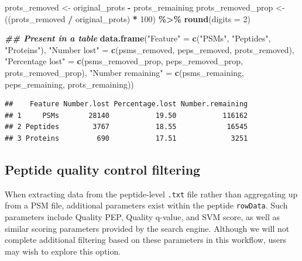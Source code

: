 \documentclass[9pt,a4paper,]{extarticle}
\newenvironment{Shaded}{\begin{snugshade}}{\end{snugshade}}
\newcommand{\AttributeTok}[1]{\textcolor[rgb]{0.13,0.29,0.53}{#1}}
\newcommand{\DecValTok}[1]{\textcolor[rgb]{0.00,0.00,0.81}{#1}}
\newcommand{\DocumentationTok}[1]{\textcolor[rgb]{0.56,0.35,0.01}{\textbf{\textit{#1}}}}
\newcommand{\FunctionTok}[1]{\textcolor[rgb]{0.13,0.29,0.53}{\textbf{#1}}}
\newcommand{\NormalTok}[1]{#1}
\newcommand{\OtherTok}[1]{\textcolor[rgb]{0.56,0.35,0.01}{#1}}
\newcommand{\SpecialCharTok}[1]{\textcolor[rgb]{0.81,0.36,0.00}{\textbf{#1}}}
\newcommand{\StringTok}[1]{\textcolor[rgb]{0.31,0.60,0.02}{#1}}
\begin{document}
\begin{Shaded}
\begin{Highlighting}[]
\NormalTok{prots\_removed }\OtherTok{\textless{}{-}}\NormalTok{ original\_prots }\SpecialCharTok{{-}}\NormalTok{ prots\_remaining}
\NormalTok{prots\_removed\_prop }\OtherTok{\textless{}{-}}\NormalTok{ ((prots\_removed }\SpecialCharTok{/}\NormalTok{ original\_prots) }\SpecialCharTok{*} \DecValTok{100}\NormalTok{) }\SpecialCharTok{\%\textgreater{}\%}
  \FunctionTok{round}\NormalTok{(}\AttributeTok{digits =} \DecValTok{2}\NormalTok{)}

\DocumentationTok{\#\# Present in a table}
\FunctionTok{data.frame}\NormalTok{(}\StringTok{"Feature"} \OtherTok{=} \FunctionTok{c}\NormalTok{(}\StringTok{"PSMs"}\NormalTok{,}
                         \StringTok{"Peptides"}\NormalTok{,}
                         \StringTok{"Proteins"}\NormalTok{),}
           \StringTok{"Number lost"} \OtherTok{=} \FunctionTok{c}\NormalTok{(psms\_removed,}
\NormalTok{                             peps\_removed,}
\NormalTok{                             prots\_removed),}
           \StringTok{"Percentage lost"} \OtherTok{=} \FunctionTok{c}\NormalTok{(psms\_removed\_prop,}
\NormalTok{                                 peps\_removed\_prop,}
\NormalTok{                                 prots\_removed\_prop),}
           \StringTok{"Number remaining"} \OtherTok{=} \FunctionTok{c}\NormalTok{(psms\_remaining,}
\NormalTok{                                  peps\_remaining,}
\NormalTok{                                  prots\_remaining))}
\end{Highlighting}
\end{Shaded}

\begin{verbatim}
##    Feature Number.lost Percentage.lost Number.remaining
## 1     PSMs       28140           19.50           116162
## 2 Peptides        3767           18.55            16545
## 3 Proteins         690           17.51             3251
\end{verbatim}

\hypertarget{peptide-quality-control-filtering}{%
\subsection{Peptide quality control filtering}\label{peptide-quality-control-filtering}}

When extracting data from the peptide-level \texttt{.txt} file rather than aggregating
up from a PSM file, additional parameters exist within the peptide \texttt{rowData}.
Such parameters include Quality PEP, Quality q-value, and SVM score, as well as
similar scoring parameters provided by the search engine. Although we will not
complete additional filtering based on these parameters in this workflow, users
may wish to explore this option.
\end{document}
